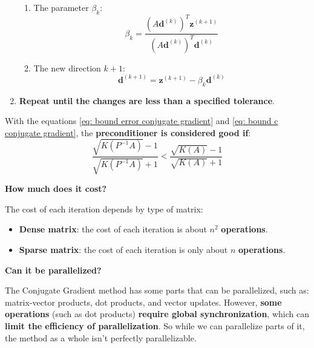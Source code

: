 \begin{enumerate}
\begin{enumerate}
        \item The parameter $\beta_{k}$:
        \begin{equation}
            \beta_{k} = \dfrac{
                \left(A\mathbf{d}^{\left(k\right)}\right)^{T}\mathbf{z}^{\left(k+1\right)}
            }{
                \left(A\mathbf{d}^{\left(k\right)}\right)^{T}\mathbf{d}^{\left(k\right)}
            }
        \end{equation}

        \item The new direction $k+1$:
        \begin{equation}
            \mathbf{d}^{\left(k+1\right)} = \mathbf{z}^{\left(k+1\right)} - \beta_{k}\mathbf{d}^{\left(k\right)}
        \end{equation}
    \end{enumerate}
    \item \textbf{Repeat until the changes are less than a specified tolerance}.
\end{enumerate}
With the equations \ref{eq: bound error conjugate gradient} and \ref{eq: bound c conjugate gradient}, the \textbf{preconditioner is considered good if}:
\begin{equation}
    \dfrac{
        \sqrt{K\left(P^{-1}A\right)}-1
    }{
        \sqrt{K\left(P^{-1}A\right)}+1
    }
    <
    \dfrac{
        \sqrt{K\left(A\right)}-1
    }{
        \sqrt{K\left(A\right)}+1
    }
\end{equation}

\newpage

\begin{flushleft}
    \textcolor{Red2}{ \textbf{How much does it cost?}}
\end{flushleft}
The cost of each iteration depends by type of matrix:
\begin{itemize}
    \item \textbf{Dense matrix}: the cost of each iteration is about $n^{2}$ \textbf{operations}.
    \item \textbf{Sparse matrix}: the cost of each iteration is only about $n$ \textbf{operations}.
\end{itemize}

\highspace
\begin{flushleft}
    \textcolor{Green3}{ \textbf{Can it be parallelized?}}
\end{flushleft}
The Conjugate Gradient method has some parts that can be parallelized, such as: matrix-vector products, dot products, and vector updates. However, \textbf{some operations} (such as dot products) \textbf{require global synchronization}, which can \textbf{limit the efficiency of parallelization}. So while we can parallelize parts of it, the method as a whole isn't perfectly parallelizable.
